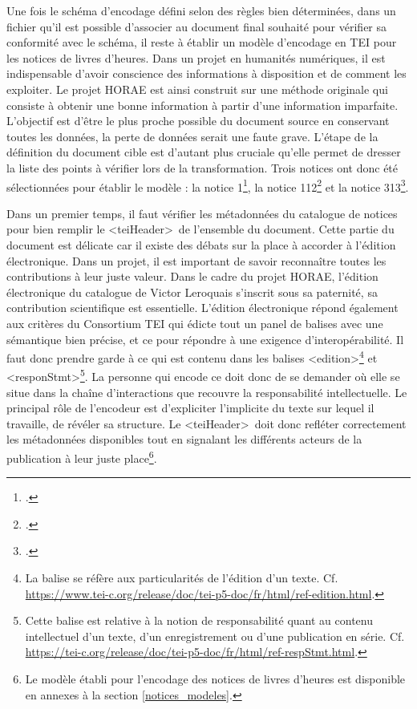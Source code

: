 \documentclass[a4paper,12pt,twoside]{book}
\begin{document}
Une fois le schéma d'encodage défini selon des règles bien déterminées, dans un fichier qu'il est possible d'associer au document final souhaité pour vérifier sa conformité avec le schéma, il reste à établir un modèle d'encodage en TEI pour les notices de livres d'heures. Dans un projet en humanités numériques, il est indispensable d'avoir conscience des informations à disposition et de comment les exploiter. Le projet HORAE est ainsi construit sur une méthode originale qui consiste à obtenir une bonne information à partir d’une information imparfaite. L’objectif est d’être le plus proche possible du document source en conservant toutes les données, la perte de données serait une faute grave. L'étape de la définition du document cible est d'autant plus cruciale qu'elle permet de dresser la liste des points à vérifier lors de la transformation. Trois notices ont donc été sélectionnées pour établir le modèle : la notice 1\footcite[p. 1-7]{Leroquais_notices}, la notice 112\footcite[p. 213-232]{Leroquais_notices} et la notice 313\footcite[p. 303-304]{Leroquais_notices}.  

Dans un premier temps, il faut vérifier les métadonnées du catalogue de notices pour bien remplir le \textless teiHeader\textgreater~de l’ensemble du document. Cette partie du document est délicate car il existe des débats sur la place à accorder à l’édition électronique. Dans un projet, il est important de savoir reconnaître toutes les contributions à leur juste valeur. Dans le cadre du projet HORAE, l’édition électronique du catalogue de Victor Leroquais s’inscrit sous sa paternité, sa contribution scientifique est essentielle. L’édition électronique répond également aux critères du Consortium TEI qui édicte tout un panel de balises avec une sémantique bien précise, et ce pour répondre à une exigence d’interopérabilité. Il faut donc prendre garde à ce qui est contenu dans les balises \textless edition\textgreater \footnote{La balise se réfère aux particularités de l'édition d'un texte. Cf. \url{https://www.tei-c.org/release/doc/tei-p5-doc/fr/html/ref-edition.html}.} et \textless responStmt\textgreater \footnote{Cette balise est relative à la notion de responsabilité quant au contenu intellectuel d'un texte, d'un enregistrement ou d'une publication en série. Cf. \url{https://tei-c.org/release/doc/tei-p5-doc/fr/html/ref-respStmt.html}.}. La personne qui encode ce doit donc de se demander où elle se situe dans la chaîne d’interactions que recouvre la responsabilité intellectuelle. Le principal rôle de l’encodeur est d’expliciter l’implicite du texte sur lequel il travaille, de révéler sa structure. Le \textless teiHeader\textgreater~doit donc refléter correctement les métadonnées disponibles tout en signalant les différents acteurs de la publication à leur juste place\footnote{Le modèle établi pour l'encodage des notices de livres d'heures est disponible en annexes à la section \ref{notices_modeles}.}.
\end{document}
